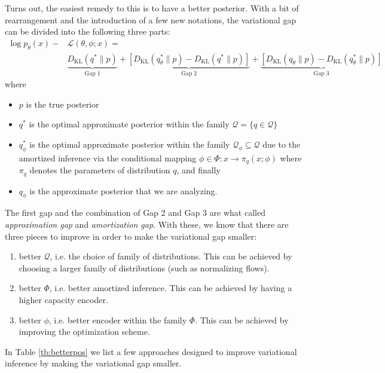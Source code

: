 \documentclass{article}
\newcommand{\ELBO}{\mathcal{L}}
\newcommand{\KL}[2]{D_{\mathrm{KL}}\left( #1 \| #2 \right)}
\begin{document}
Turns out, the easiest remedy to this is to have a better posterior. 
With a bit of rearrangement and the introduction of a few new notations, the variational gap can be divided into the following three parts:
\begin{equation}
\begin{split}
\log p_{\theta}(x) - &\ELBO(\theta, \phi; x) = \\
&\underset{\text{Gap 1}}{\underbrace{\KL{q^*}{p}}} + \underset{\text{Gap 2}}{\underbrace{[\KL{q^*_\theta}{p}-\KL{q^*}{p}]}} + \underset{\text{Gap 3}}{\underbrace{[\KL{q_\theta}{p}-\KL{q^*_\theta}{p}]}}
\end{split}
\end{equation}
where  
\begin{itemize}
\item $p$ is the true posterior
\item $q^*$ is the optimal approximate posterior within the family $\mathcal{Q}=\{q\in \mathcal{Q}\}$
\item $q^*_\phi$ is the optimal approximate posterior within the family $\mathcal{Q}_\phi\subseteq\mathcal{Q}$ due to the amortized inference via the conditional mapping $\phi\in\Phi:x\rightarrow \pi_q(x;\phi)$ where $\pi_q$ denotes the parameters of distribution $q$, and finally
\item $q_\phi$ is the approximate posterior that we are analyzing. 
\end{itemize}


The first gap and the combination of Gap 2 and Gap 3 are what \citet{cremer2017inference} called \textit{approximation gap} and \textit{amortization gap}. 
With these, we know that there are three pieces to improve in order to make the variational gap smaller:

\begin{enumerate}
\item better $\mathcal{Q}$, i.e. the choice of family of distributions. This can be achieved by choosing a larger family of distributions (such as normalizing flows).
\item better $\Phi$, i.e. better amortized inference. This can be achieved by having a higher capacity encoder.
\item better $\phi$, i.e. better encoder within the family $\Phi$. This can be achieved by improving the optimization scheme. 
\end{enumerate}

In Table \ref{tb:betterpos} we list a few approaches designed to improve variational inference by making the variational gap smaller. 
\end{document}
